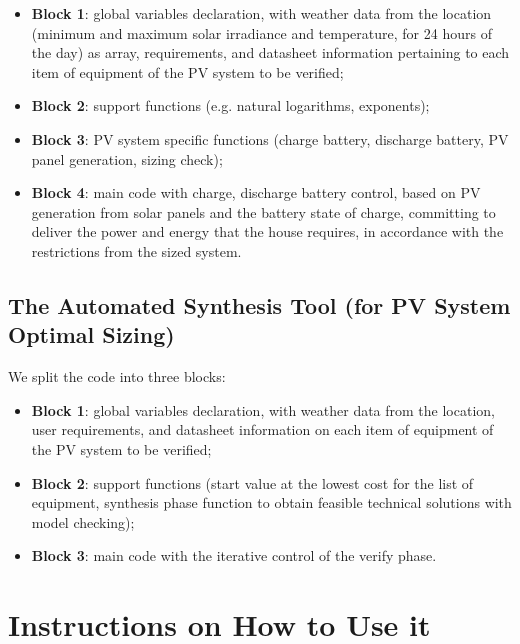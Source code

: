 \begin{itemize}
\item \textbf{Block 1}: global variables declaration, with weather data from the location (minimum and maximum solar irradiance and temperature, for 24 hours of the day) as array, requirements, and datasheet information pertaining to each item of equipment of the PV system to be verified; 

\item \textbf{Block 2}: support functions (e.g. natural logarithms,  exponents);

\item \textbf{Block 3}: PV system specific functions (charge battery, discharge battery, PV panel generation, sizing check);

\item \textbf{Block 4}: main code with charge, discharge battery control, based on PV generation from solar panels and the battery state of charge, committing to deliver the power and energy that the house requires, in  accordance with the restrictions from the sized system.
\end{itemize}

\subsection{The Automated Synthesis Tool (for PV System Optimal Sizing)}
\label{sec:automatedsynthesis}

We split the code into three blocks:

\begin{itemize}
\item \textbf{Block 1}: global variables declaration, with weather data from the location, user requirements, and datasheet information on each item of equipment of the PV system to be verified; 

\item \textbf{Block 2}: support functions (start value at the lowest cost for the list of equipment, synthesis phase function to obtain feasible technical solutions with model checking);

\item \textbf{Block 3}: main code with the iterative control of the verify phase.
\end{itemize}


\section{Instructions on How to Use it}

